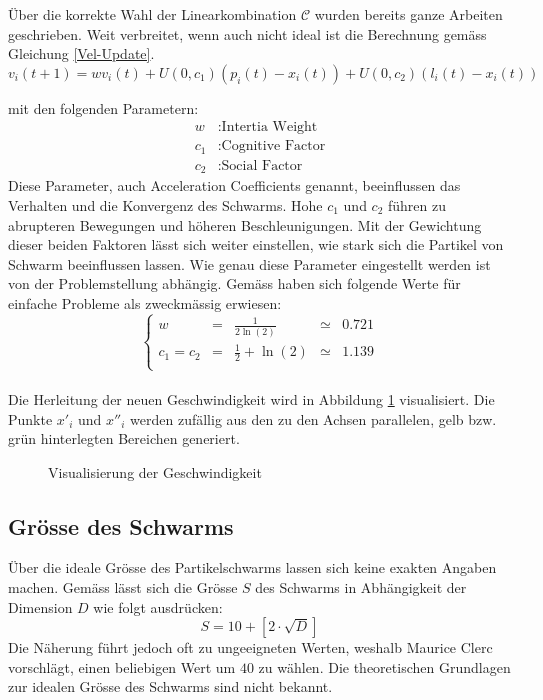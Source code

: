 Über die korrekte Wahl der Linearkombination $\mathcal{C}$ wurden bereits ganze Arbeiten geschrieben. Weit verbreitet, wenn auch nicht ideal ist die Berechnung gemäss Gleichung \ref{Vel-Update}. \\
\begin{equation}
	v_i(t+1) = w v_i(t) + U(0,c_1) (p_i(t)-x_i(t)) + U(0,c_2) (l_i(t)-x_i(t))\label{Vel-Update}
\end{equation}

mit den folgenden Parametern:
\begin{align*}
	w &: \text{Intertia Weight} \\
	c_1 &: \text{Cognitive Factor} \\
	c_2 &: \text{Social Factor}
\end{align*}
Diese Parameter, auch Acceleration Coefficients genannt, beeinflussen das  Verhalten und die Konvergenz des Schwarms. Hohe $c_1$ und $c_2$ führen zu abrupteren Bewegungen und höheren Beschleunigungen. Mit der Gewichtung dieser beiden Faktoren lässt sich weiter einstellen, wie stark sich die Partikel von Schwarm beeinflussen lassen. Wie genau diese Parameter eingestellt werden ist von der Problemstellung abhängig. Gemäss \cite{Clerc-Stagnation} haben sich folgende Werte für einfache Probleme als zweckmässig erwiesen:
\begin{equation}
	\left\lbrace \begin{array}{lllll}
		w & = & \frac{1}{2 \ln(2)} & \simeq & 0.721 \\
		c_1 = c_2 & = & \frac{1}{2} + \ln(2) & \simeq & 1.139 \\
	\end{array}	\right. 
\end{equation} \\


Die Herleitung der neuen Geschwindigkeit wird in Abbildung \ref{Fig-Visualisierung-Geschwindigkeit} visualisiert. Die Punkte $x'_i$ und $x''_i$ werden zufällig aus den zu den Achsen parallelen, gelb bzw. grün hinterlegten Bereichen generiert.  \\
\begin{figure}[htbp]
	\centering
	
	\caption{Visualisierung der Geschwindigkeit}
	\label{Fig-Visualisierung-Geschwindigkeit}
\end{figure}


\subsection{Grösse des Schwarms}
Über die ideale Grösse des Partikelschwarms lassen sich keine exakten Angaben machen. Gemäss \cite{Clerc-Standards} lässt sich die Grösse $S$ des Schwarms in Abhängigkeit der Dimension $D$ wie folgt ausdrücken:
\begin{equation}
	S = 10 + \left[ 2 \cdot \sqrt{D} \right]
\end{equation}
Die Näherung führt jedoch oft zu ungeeigneten Werten, weshalb Maurice Clerc vorschlägt, einen beliebigen Wert um $40$ zu wählen. Die theoretischen Grundlagen zur idealen Grösse des Schwarms sind nicht bekannt.


